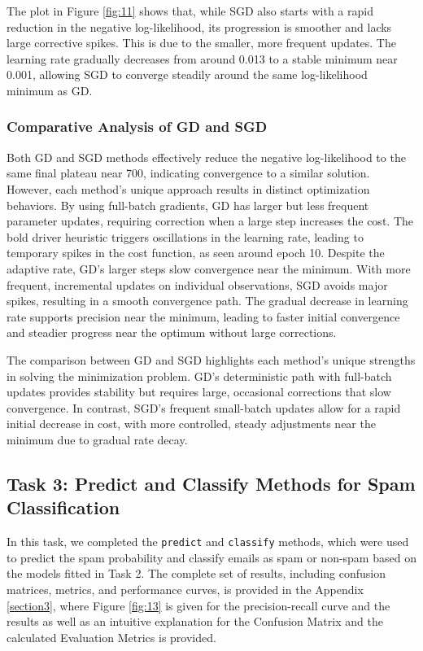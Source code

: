 \documentclass[a4paper,oneside,bibliography=totoc]{scrartcl}
\begin{document}
The plot in Figure \ref{fig:11} shows that, while SGD also starts with a rapid reduction in the negative log-likelihood, its progression is smoother and lacks large corrective spikes. This is due to the smaller, more frequent updates. The learning rate gradually decreases from around 0.013 to a stable minimum near 0.001, allowing SGD to converge steadily around the same log-likelihood minimum as GD.


\subsubsection{Comparative Analysis of GD and SGD}

Both GD and SGD methods effectively reduce the negative log-likelihood to the same final plateau near 700, indicating convergence to a similar solution. However, each method’s unique approach results in distinct optimization behaviors. By using full-batch gradients, GD has larger but less frequent parameter updates, requiring correction when a large step increases the cost. The bold driver heuristic triggers oscillations in the learning rate, leading to temporary spikes in the cost function, as seen around epoch 10. Despite the adaptive rate, GD’s larger steps slow convergence near the minimum. With more frequent, incremental updates on individual observations, SGD avoids major spikes, resulting in a smooth convergence path. The gradual decrease in learning rate supports precision near the minimum, leading to faster initial convergence and steadier progress near the optimum without large corrections.

The comparison between GD and SGD highlights each method’s unique strengths in solving the minimization problem. GD’s deterministic path with full-batch updates provides stability but requires large, occasional corrections that slow convergence. In contrast, SGD’s frequent small-batch updates allow for a rapid initial decrease in cost, with more controlled, steady adjustments near the minimum due to gradual rate decay.


\subsection{Task 3: Predict and Classify Methods for Spam Classification}

In this task, we completed the \texttt{predict} and \texttt{classify} methods, which were used to predict the spam probability and classify emails as spam or non-spam based on the models fitted in Task 2. The complete set of results, including confusion matrices, metrics, and performance curves, is provided in the Appendix \ref{section3}, where Figure \ref{fig:13} is given for the precision-recall curve and the results as well as an intuitive explanation for the Confusion Matrix and the calculated Evaluation Metrics is provided.
\end{document}
